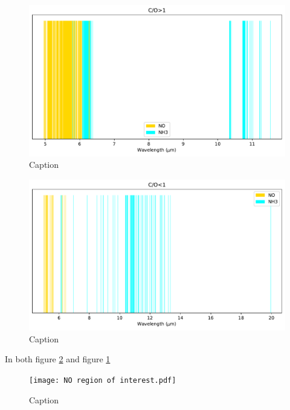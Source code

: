 \documentclass[twoside, single, authoryear, semicolon]{lion-msc}
\newcommand{\4}{$_4$}
\newcommand{\3}{$_3$}
\newcommand{\2}{$_2$}
\begin{document}
\begin{figure}[!ht]
    \centering
    \includegraphics[width=\linewidth]{Figures/ClassificationCOgt0.pdf}
    \caption{Caption}
    \label{fig:class>1}
\end{figure}

\begin{figure}[!ht]
    \centering
    \includegraphics[width=\linewidth]{Figures/ClassificationCOst0.pdf}
    \caption{Caption}
    \label{fig:class<1}
\end{figure}

In both figure \ref{fig:class<1} and figure \ref{fig:class>1}

\begin{figure}[!ht]
    \centering
    \texttt{[image: NO region of interest.pdf]}
    \caption{Caption}
    \label{fig:enter-label}
\end{figure}
\end{document}
